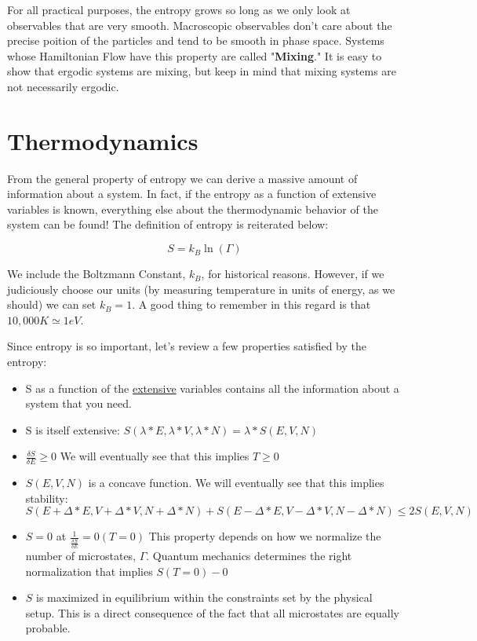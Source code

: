 \documentclass{book}
\newcommand{\pardif}[2]{\frac{\delta#1}{\delta#2}}
\newcommand{\bltz}{k_{B}}
\begin{document}
For all practical purposes, the entropy grows so long as we only look at observables that are very smooth.  Macroscopic observables don't care about the precise poition of the particles and tend to be smooth in phase space.  Systems whose Hamiltonian Flow have this property are called "\textbf{Mixing}."  It is easy to show that ergodic systems are mixing, but keep in mind that mixing systems are not necessarily ergodic.    

\chapter{Thermodynamics}

From the general property of entropy we can derive a massive amount of information about a system.  In fact, if the entropy as a function of extensive variables is known, everything else about the thermodynamic behavior of the system can be found!  The definition of entropy is reiterated below:

$$S=\bltz\ln(\Gamma)$$

We include the Boltzmann Constant, $\bltz$, for historical reasons.  However, if we judiciously choose our units (by measuring temperature in units of energy, as we should) we can set $\bltz=1$.  A good thing to remember in this regard is that $10,000K\simeq1eV$.  

Since entropy is so important, let's review a few properties satisfied by the entropy:

\begin{itemize}
	\item S as a function of the \underline{extensive} variables contains all the information about a system that you need.
	\item S is itself extensive: $S(\lambda*E,\lambda*V,\lambda*N)=\lambda*S(E,V,N)$
	\item $\pardif{S}{E}\geq0$  We will eventually see that this implies $T\geq0$
	\item $S(E,V,N)$ is a concave function.  We will eventually see that this implies stability: \\
	$S(E+\Delta*E,V+\Delta*V,N+\Delta*N)+S(E-\Delta*E,V-\Delta*V,N-\Delta*N)\leq2S(E,V,N)$\\ 
	\item $S=0$ at $\frac{1}{\pardif{S}{E}}=0 (T=0)$  This property depends on how we normalize the number of microstates, $\Gamma$.  Quantum mechanics determines the right normalization that implies $S(T=0)-0$
	\item $S$ is maximized in equilibrium within the constraints set by the physical setup.  This is a direct consequence of the fact that all microstates are equally probable.
\end{itemize}
\end{document}
